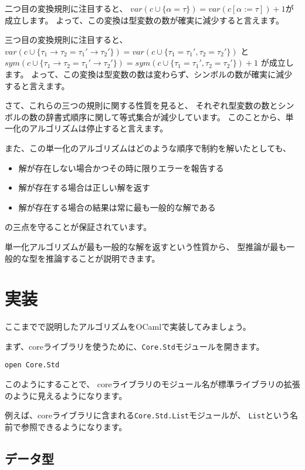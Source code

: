 二つ目の変換規則に注目すると、
$\mathit{var}(c \cup \{\alpha = \tau\}) = \mathit{var}(c[\alpha := \tau])+1$が成立します。
よって、この変換は型変数の数が確実に減少すると言えます。

三つ目の変換規則に注目すると、
$\mathit{var}(c \cup \{\tau_1 \to \tau_2 = \tau_1' \to \tau_2'\}) =
\mathit{var}(c \cup \{\tau_1 = \tau_1', \tau_2 = \tau_2'\})$
と
$\mathit{sym}(c \cup \{\tau_1 \to \tau_2 = \tau_1' \to \tau_2'\}) =
\mathit{sym}(c \cup \{\tau_1 = \tau_1', \tau_2 = \tau_2'\})+1$
が成立します。
よって、この変換は型変数の数は変わらず、シンボルの数が確実に減少すると言えます。

さて、これらの三つの規則に関する性質を見ると、
それぞれ型変数の数とシンボルの数の辞書式順序に関して等式集合が減少しています。
このことから、単一化のアルゴリズムは停止すると言えます。

また、この単一化のアルゴリズムはどのような順序で制約を解いたとしても、
\begin{itemize}
  \item 解が存在しない場合かつその時に限りエラーを報告する
  \item 解が存在する場合は正しい解を返す
  \item 解が存在する場合の結果は常に最も一般的な解である
\end{itemize}
の三点を守ることが保証されています。

単一化アルゴリズムが最も一般的な解を返すという性質から、
型推論が最も一般的な型を推論することが説明できます。

\section{実装}

ここまでで説明したアルゴリズムをOCamlで実装してみましょう。

まず、coreライブラリを使うために、\texttt{Core.Std}モジュールを開きます。

\begin{lstlisting}
open Core.Std
\end{lstlisting}

このようにすることで、
coreライブラリのモジュール名が標準ライブラリの拡張のように見えるようになります。

例えば、coreライブラリに含まれる\texttt{Core.Std.List}モジュールが、
\texttt{List}という名前で参照できるようになります。

\subsection{データ型}

